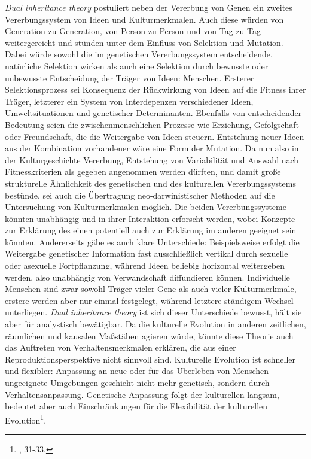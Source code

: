 \documentclass[openany,twoside,twocolumn]{book}
\let\rmarkdownfootnote\footnote%
\def\footnote{\protect\rmarkdownfootnote}
\begin{document}
\emph{Dual inheritance theory} postuliert neben der Vererbung von Genen
ein zweites Vererbungssystem von Ideen und Kulturmerkmalen. Auch diese
würden von Generation zu Generation, von Person zu Person und von Tag zu
Tag weitergereicht und stünden unter dem Einfluss von Selektion und
Mutation. Dabei würde sowohl die im genetischen Vererbungssystem
entscheidende, natürliche Selektion wirken als auch eine Selektion durch
bewusste oder unbewusste Entscheidung der Träger von Ideen: Menschen.
Ersterer Selektionsprozess sei Konsequenz der Rückwirkung von Ideen auf
die Fitness ihrer Träger, letzterer ein System von Interdepenzen
verschiedener Ideen, Umweltsituationen und genetischer Determinanten.
Ebenfalls von entscheidender Bedeutung seien die zwischenmenschlichen
Prozesse wie Erziehung, Gefolgschaft oder Freundschaft, die die
Weitergabe von Ideen steuern. Entstehung neuer Ideen aus der Kombination
vorhandener wäre eine Form der Mutation. Da nun also in der
Kulturgeschichte Vererbung, Entstehung von Variabilität und Auswahl nach
Fitnesskriterien als gegeben angenommen werden dürften, und damit große
strukturelle Ähnlichkeit des genetischen und des kulturellen
Vererbungssystems bestünde, sei auch die Übertragung neo-darwinistischer
Methoden auf die Untersuchung von Kulturmerkmalen möglich. Die beiden
Vererbungssysteme könnten unabhängig und in ihrer Interaktion erforscht
werden, wobei Konzepte zur Erklärung des einen potentiell auch zur
Erklärung im anderen geeignet sein könnten. Andererseits gäbe es auch
klare Unterschiede: Beispielsweise erfolgt die Weitergabe genetischer
Information fast ausschließlich vertikal durch sexuelle oder asexuelle
Fortpflanzung, während Ideen beliebig horizontal weitergeben werden,
also unabhängig von Verwandschaft diffundieren können. Individuelle
Menschen sind zwar sowohl Träger vieler Gene als auch vieler
Kulturmerkmale, erstere werden aber nur einmal festgelegt, während
letztere ständigem Wechsel unterliegen. \emph{Dual inheritance theory}
ist sich dieser Unterschiede bewusst, hält sie aber für analystisch
bewätigbar. Da die kulturelle Evolution in anderen zeitlichen,
räumlichen und kausalen Maßstäben agieren würde, könnte diese Theorie
auch das Auftreten von Verhaltensmerkmalen erklären, die aus einer
Reproduktionsperspektive nicht sinnvoll sind. Kulturelle Evolution ist
schneller und flexibler: Anpassung an neue oder für das Überleben von
Menschen ungeeignete Umgebungen geschieht nicht mehr genetisch, sondern
durch Verhaltensanpassung. Genetische Anpassung folgt der kulturellen
langsam, bedeutet aber auch Einschränkungen für die Flexibilität der
kulturellen Evolution\footnote{\textcite{SmithThreestylesevolutionary2000},
  31-33.}.
\end{document}
